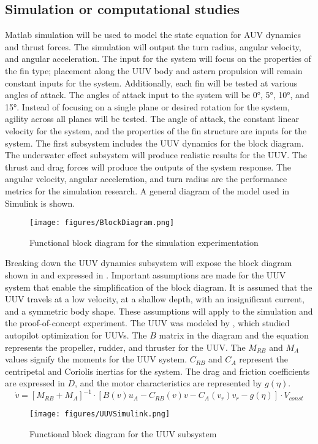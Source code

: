 \documentclass{IEEEtran}
\begin{document}
\subsection{Simulation or computational studies}
Matlab simulation will be used to model the state equation for AUV dynamics and thrust forces.  The simulation will output the turn radius, angular velocity, and angular acceleration.  The input for the system will focus on the properties of the fin type; placement along the UUV body and astern propulsion will remain constant inputs for the system.  Additionally, each fin will be tested at various angles of attack.  The angles of attack input to the system will be \ang{0}, \ang{5}, \ang{10}, and \ang{15}.  Instead of focusing on a single plane or desired rotation for the system, agility across all planes will be tested.  The angle of attack, the constant linear velocity for the system, and the properties of the fin structure are inputs for the system.  The first subsystem includes the UUV dynamics for the block diagram.  The underwater effect subsystem will produce realistic results for the UUV.  The thrust and drag forces will produce the outputs of the system response.  The angular velocity, angular acceleration, and turn radius are the performance metrics for the simulation research.  A general diagram of the model used in Simulink is shown. 
\begin{figure*}
\begin{center}
\texttt{[image: figures/BlockDiagram.png]}
\end{center}
\caption{Functional block diagram for the simulation experimentation}
\label{fig:3}
\end{figure*}

Breaking down the UUV dynamics subsystem will expose the block diagram shown in  and expressed in .  Important assumptions are made for the UUV system that enable the simplification of the block diagram.  It is assumed that the UUV travels at a low velocity, at a shallow depth, with an insignificant current, and a symmetric body shape.  These assumptions will apply to the simulation and the proof-of-concept experiment.  The UUV was modeled by \cite{taubert2014model}, which studied autopilot optimization for UUVs.  The $B$ matrix in the diagram and the equation represents the propeller, rudder, and thruster for the UUV.  The $M_{RB}$ and $M_A$ values signify the moments for the UUV system.  $C_{RB}$ and $C_A$ represent the centripetal and Coriolis inertias for the system.  The drag and friction coefficients are expressed in $D$, and the motor characteristics are represented by $g(\eta)$.  
\begin{equation}
\dot{v} = 
\left[ M_{RB} + M_A \right]^{-1} \cdot
\left[ B(v) u_A - C_{RB}(v) v - C_A(v_r)v_r - g(\eta) \right] \cdot
V_{const}
\label{eq:1}
\end{equation}
\begin{figure*}
\begin{center}
\texttt{[image: figures/UUVSimulink.png]}
\end{center}
\caption{Functional block diagram for the UUV subsystem \cite{taubert2014model}}
\label{fig:4}
\end{figure*}
\end{document}

